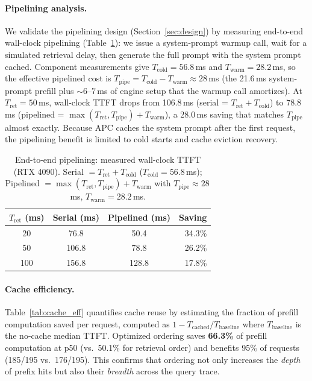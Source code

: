 \documentclass{article}
\begin{document}
\paragraph{Pipelining analysis.}
We validate the pipelining design (Section~\ref{sec:design}) by measuring end-to-end wall-clock pipelining (Table~\ref{tab:pipelining_e2e}): we issue a system-prompt warmup call, wait for a simulated retrieval delay, then generate the full prompt with the system prompt cached. Component measurements give $T_{\text{cold}} = 56.8$\,ms and $T_{\text{warm}} = 28.2$\,ms, so the effective pipelined cost is $T_{\text{pipe}} = T_{\text{cold}} - T_{\text{warm}} \approx 28$\,ms (the 21.6\,ms system-prompt prefill plus ${\sim}6$--$7$\,ms of engine setup that the warmup call amortizes). At $T_{\text{ret}} = 50$\,ms, wall-clock TTFT drops from 106.8\,ms (serial = $T_{\text{ret}} + T_{\text{cold}}$) to 78.8\,ms (pipelined = $\max(T_{\text{ret}}, T_{\text{pipe}}) + T_{\text{warm}}$), a 28.0\,ms saving that matches $T_{\text{pipe}}$ almost exactly. Because APC caches the system prompt after the first request, the pipelining benefit is limited to cold starts and cache eviction recovery.

\begin{table}[t]
\caption{End-to-end pipelining: measured wall-clock TTFT (RTX 4090). Serial $=T_{\text{ret}}+T_{\text{cold}}$ ($T_{\text{cold}}=56.8$\,ms); Pipelined $=\max(T_{\text{ret}},T_{\text{pipe}})+T_{\text{warm}}$ with $T_{\text{pipe}}\approx 28$\,ms, $T_{\text{warm}}=28.2$\,ms.}
\label{tab:pipelining_e2e}
\centering
\small
\begin{tabular}{@{}cccr@{}}
\toprule
\textbf{$T_{\text{ret}}$ (ms)} & \textbf{Serial (ms)} & \textbf{Pipelined (ms)} & \textbf{Saving} \\
\midrule
20  & 76.8  & 50.4  & 34.3\% \\
50  & 106.8 & 78.8  & 26.2\% \\
100 & 156.8 & 128.8 & 17.8\% \\
\bottomrule
\end{tabular}
\vspace{-0.5em}
\end{table}

\paragraph{Cache efficiency.}
Table~\ref{tab:cache_eff} quantifies cache reuse by estimating the fraction of prefill computation saved per request, computed as $1 - T_{\text{cached}} / T_{\text{baseline}}$ where $T_{\text{baseline}}$ is the no-cache median TTFT. Optimized ordering saves \textbf{66.3\%} of prefill computation at p50 (vs.\ 50.1\% for retrieval order) and benefits 95\% of requests (185/195 vs.\ 176/195). This confirms that ordering not only increases the \emph{depth} of prefix hits but also their \emph{breadth} across the query trace.
\end{document}
